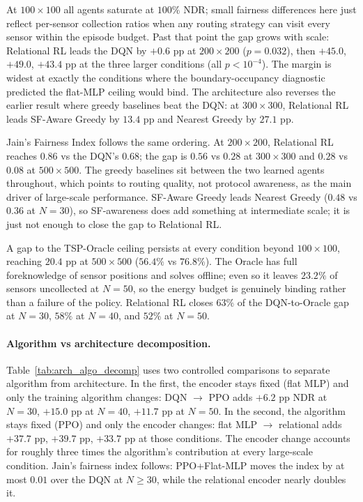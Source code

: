 At $100{\times}100$ all agents saturate at $100\%$ NDR; small fairness differences here just reflect per-sensor collection ratios when any routing strategy can visit every sensor within the episode budget. Past that point the gap grows with scale: Relational RL leads the DQN by $+0.6$ pp at $200{\times}200$ ($p=0.032$), then $+45.0$, $+49.0$, $+43.4$ pp at the three larger conditions (all $p<10^{-4}$). The margin is widest at exactly the conditions where the boundary-occupancy diagnostic predicted the flat-MLP ceiling would bind. The architecture also reverses the earlier result where greedy baselines beat the DQN: at $300{\times}300$, Relational RL leads SF-Aware Greedy by $13.4$ pp and Nearest Greedy by $27.1$ pp.

Jain's Fairness Index follows the same ordering. At $200{\times}200$, Relational RL reaches $0.86$ vs the DQN's $0.68$; the gap is $0.56$ vs $0.28$ at $300{\times}300$ and $0.28$ vs $0.08$ at $500{\times}500$. The greedy baselines sit between the two learned agents throughout, which points to routing quality, not protocol awareness, as the main driver of large-scale performance. SF-Aware Greedy leads Nearest Greedy ($0.48$ vs $0.36$ at $N{=}30$), so SF-awareness does add something at intermediate scale; it is just not enough to close the gap to Relational RL.

A gap to the TSP-Oracle ceiling persists at every condition beyond $100{\times}100$, reaching $20.4$ pp at $500{\times}500$ ($56.4\%$ vs $76.8\%$). The Oracle has full foreknowledge of sensor positions and solves offline; even so it leaves $23.2\%$ of sensors uncollected at $N{=}50$, so the energy budget is genuinely binding rather than a failure of the policy. Relational RL closes $63\%$ of the DQN-to-Oracle gap at $N{=}30$, $58\%$ at $N{=}40$, and $52\%$ at $N{=}50$.

\paragraph{Algorithm vs architecture decomposition.}
Table~\ref{tab:arch_algo_decomp} uses two controlled comparisons to separate algorithm from architecture. In the first, the encoder stays fixed (flat MLP) and only the training algorithm changes: DQN $\to$ PPO adds $+6.2$ pp NDR at $N{=}30$, $+15.0$ pp at $N{=}40$, $+11.7$ pp at $N{=}50$. In the second, the algorithm stays fixed (PPO) and only the encoder changes: flat MLP $\to$ relational adds $+37.7$ pp, $+39.7$ pp, $+33.7$ pp at those conditions. The encoder change accounts for roughly three times the algorithm's contribution at every large-scale condition. Jain's fairness index follows: PPO+Flat-MLP moves the index by at most $0.01$ over the DQN at $N{\ge}30$, while the relational encoder nearly doubles it.

